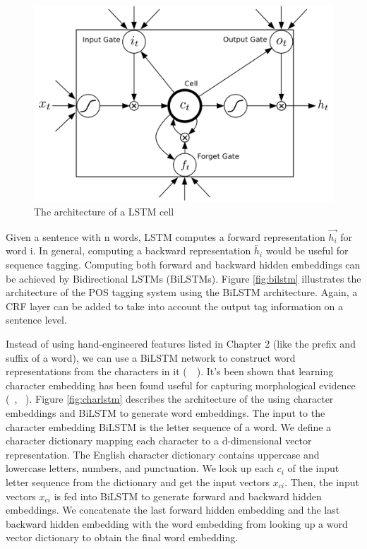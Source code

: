 \documentclass{sfuthesis}
\begin{document}
\begin{figure}
  \centering
  \includegraphics[scale=0.6]{lstmcell.png}
 \caption{The architecture of a LSTM cell}
  \label{fig:lstmcell}
\end{figure}

Given a sentence with n words, LSTM computes a forward representation $\overrightarrow {h_{i}}$ for word i. In general, computing a backward representation $\overleftarrow {h_{i}}$ would be useful for sequence tagging. Computing both forward and backward hidden embeddings can be achieved by Bidirectional LSTMs (BiLSTMs). Figure \ref{fig:bilstm} illustrates the architecture of the POS tagging system using the BiLSTM architecture. Again, a CRF layer can be added to take into account the output tag information on a sentence level.

Instead of using hand-engineered features listed in Chapter 2 (like the prefix and suffix of a word), we can use a BiLSTM network to construct word representations from the characters in it (~\citeauthor{lample2016neural}~\citeyear{lample2016neural}). It's been shown that learning character embedding has been found useful for capturing morphological evidence (~\citeauthor{ling2015finding}, ~\citeyear{ling2015finding}). Figure \ref{fig:charlstm} describes the architecture of the using character embeddings and BiLSTM to generate word embeddings. The input to the character embedding BiLSTM is the letter sequence of a word. We define a character dictionary mapping each character to a d-dimensional vector representation. The English character dictionary contains uppercase and lowercase letters, numbers, and punctuation. We look up each $c_{i}$ of the input letter sequence from the dictionary and get the input vectors $x_{ci}$. Then, the input vectors $x_{ci}$ is fed into BiLSTM to generate forward and backward hidden embeddings. We concatenate the last forward hidden embedding and the last backward hidden embedding with the word embedding from looking up a word vector dictionary to obtain the final word embedding.
\end{document}
